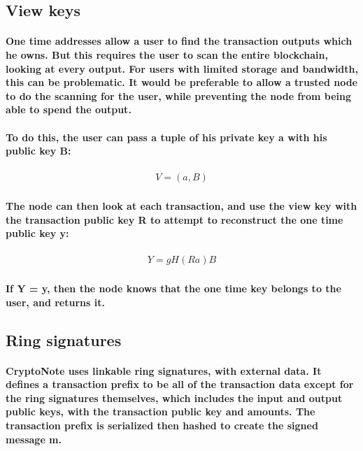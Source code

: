 \documentclass{article}
\begin{document}
\subsection{View keys}

\paragraph{One time addresses allow a user to find the transaction outputs which he owns.  But this requires the user to scan the entire blockchain, looking at every output.  For users with limited storage and bandwidth, this can be problematic.  It would be preferable to allow a trusted node to do the scanning for the user, while preventing the node from being able to spend the output.}

\paragraph{To do this, the user can pass a tuple of his private key a with his public key B:}

\begin{eqnarray}
  V = (a, B)
\end{eqnarray}

\paragraph{The node can then look at each transaction, and use the view key with the transaction public key R to attempt to reconstruct the one time public key y:}

\begin{eqnarray}
  Y=gH(Ra)B
\end{eqnarray}

\paragraph{If Y = y, then the node knows that the one time key belongs to the user, and returns it.}


\subsection{Ring signatures}

\paragraph{CryptoNote uses linkable ring signatures, with external data.  It defines a transaction prefix to be all of the transaction data except for the ring signatures themselves, which includes the input and output public keys, with the transaction public key and amounts.  The transaction prefix is serialized then hashed to create the signed message m.}
\end{document}
